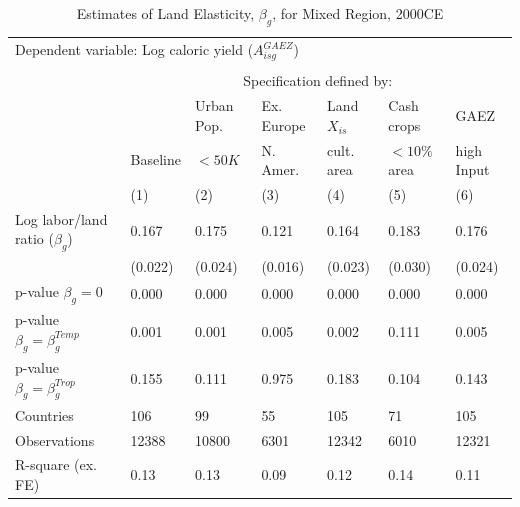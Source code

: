 \documentclass[12pt]{article}
\begin{document}
\begin{table}[!htb]
{}
\end{table}

\clearpage

\begin{table}[!htb]
\begin{center}
\caption{Estimates of Land Elasticity, $\beta_g$, for Mixed Region, 2000CE}
\label{TAB_beta_mixed}
{\footnotesize
\begin{tabularx}{\textwidth}{lXXXXXX}
\midrule
\multicolumn{7}{l}{Dependent variable: Log caloric yield ($A^{GAEZ}_{isg}$)} \\ \\
 & \multicolumn{6}{c}{Specification defined by:} \\ \cmidrule(lr){2-7} 
 &          &  Urban Pop. & Ex. Europe    & Land $X_{is}$    & Cash crops  & GAEZ  \\
 & Baseline &$<50K$       & N. Amer. & cult. area       & $<10\%$ area &  high Input \\
 & (1) & (2) & (3) & (4) & (5) & (6) \\
\midrule
Log labor/land ratio ($\beta_g$)&       0.167&       0.175&       0.121&       0.164&       0.183&       0.176\\
                    &     (0.022)&     (0.024)&     (0.016)&     (0.023)&     (0.030)&     (0.024)\\
\midrule
p-value $\beta_g=0$ &       0.000&       0.000&       0.000&       0.000&       0.000&       0.000\\
p-value $\beta_g=\beta_g^{Temp}$&       0.001&       0.001&       0.005&       0.002&       0.111&       0.005\\
p-value $\beta_g=\beta_g^{Trop}$&       0.155&       0.111&       0.975&       0.183&       0.104&       0.143\\
Countries           &         106&          99&          55&         105&          71&         105\\
Observations        &       12388&       10800&        6301&       12342&        6010&       12321\\
R-square (ex. FE)   &        0.13&        0.13&        0.09&        0.12&        0.14&        0.11\\
\midrule
\end{tabularx}
}
\end{center}

\end{table}
\end{document}
